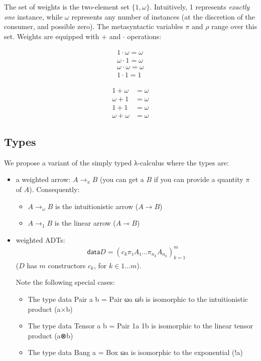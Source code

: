 \documentclass[11pt]{article}
\begin{document}
The set of weights is the two-element set $\{1,ω\}$. Intuitively, 1
represents \emph{exactly one} instance, while $ω$ represents any
number of instances (at the discretion of the consumer, and possible
zero).  The metasyntactic variables \(π\) and \(ρ\) range over this
set. Weights are equipped with + and $·$ operations:


\begin{align*}
1 · ω = ω \\
ω · 1 = ω \\
ω · ω = ω \\
1 · 1 = 1
\end{align*}

\begin{align*}
1 + ω &= ω \\
ω + 1 &= ω \\
1 + 1 &= ω \\
ω + ω &= ω
\end{align*}

\subsection{Types}
\label{sec:orgheadline2}

We propose a variant of the simply typed λ-calculus where the types
are:

\begin{itemize}
\item a weighted arrow: \(A →_π B\) (you can get a \(B\) if you can provide a
quantity \(π\) of \(A\)). Consequently:
\begin{itemize}
\item \(A →_ω B\) is the intuitionistic arrow (\(A → B\))
\item \(A →_1 B\) is the linear arrow (\(A ⊸ B\))
\end{itemize}
\item weighted ADTs:
\begin{align*}
\mathsf{data} D = \left(c_k  π₁ A₁  …  π_{n_k} A_{n_k}\right)^m_{k=1}
\end{align*}
(\(D\) has \(m\) constructors \(c_k\), for \(k ∈ 1…m\)).

Note the following special cases:
\begin{itemize}
\item The type data Pair a b = Pair ωa ωb is isomorphic to the intuitionistic product (a×b)
\item The type data Tensor a b = Pair 1a 1b is isomorphic to the linear tensor product (a⊗b)
\item The type data Bang a = Box ωa is isomorphic to the exponential (!a)
\end{itemize}
\end{itemize}
\end{document}
